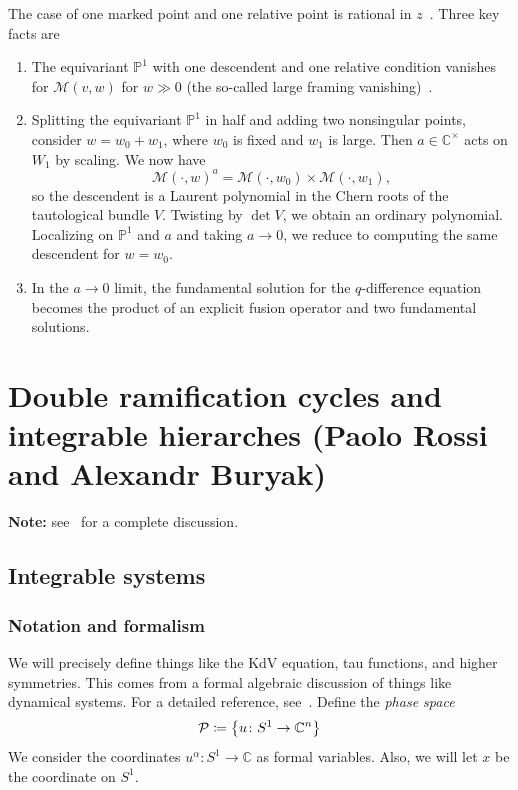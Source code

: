 \documentclass[leqno, openany]{memoir}
\theoremstyle{definition}
\theoremstyle{remark}
\theoremstyle{plain}
\theoremstyle{definition}
\theoremstyle{remark}
\newcommand{\C}{\mathbb{C}}
\renewcommand{\P}{\mathbb{P}}
\newcommand{\mc}[1]{\mathcal{#1}}
\begin{document}
The case of one marked point and one relative point is rational in $z$~\cite{ratcapdescvertex}. Three key facts are
\begin{enumerate}
    \item The equivariant $\P^1$ with one descendent and one relative condition vanishes for $\mc{M}(v, w)$ for $w \gg 0$ (the so-called large framing vanishing)~\cite{pcmi}.
    \item Splitting the equivariant $\P^1$ in half and adding two nonsingular points, consider $w = w_0 + w_1$, where $w_0$ is fixed and $w_1$ is large. Then $a \in \C^{\times}$ acts on $W_1$ by scaling. We now have
        \[ \mc{M}(\cdot, w)^a = \mc{M}(\cdot, w_0) \times \mc{M}(\cdot, w_1), \]
        so the descendent is a Laurent polynomial in the Chern roots of the tautological bundle $V$. Twisting by $\det V$, we obtain an ordinary polynomial. Localizing on $\P^1$ and $a$ and taking $a \to 0$, we reduce to computing the same descendent for $w = w_0$.
    \item In the $a \to 0$ limit, the fundamental solution for the $q$-difference equation becomes the product of an explicit fusion operator and two fundamental solutions.
\end{enumerate}

\chapter{Double ramification cycles and integrable hierarches (Paolo Rossi and Alexandr Buryak)}%

\textbf{Note:} see~\cite{rossisurvey} for a complete discussion.

\section{Integrable systems}

\subsection{Notation and formalism}

We will precisely define things like the KdV equation, tau functions, and higher symmetries. This comes from a formal algebraic discussion of things like dynamical systems. For a detailed reference, see~\cite{dubzhang}. Define the \textit{phase space}
\[ \mc{P} \coloneqq \qty{u \colon S^1 \to \C^n} \]
We consider the coordinates $u^{\alpha} \colon S^1 \to \C$ as formal variables. Also, we will let $x$ be the coordinate on $S^1$.
\end{document}
